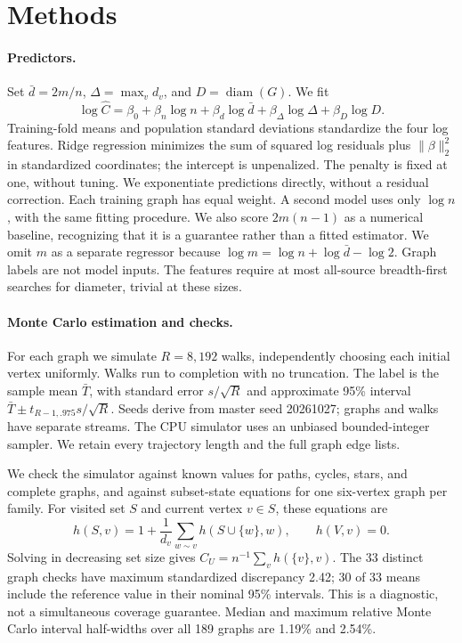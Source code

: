 \documentclass{article}
\begin{document}
\section{Methods}
\paragraph{Predictors.}
Set $\bar d=2m/n$, $\Delta=\max_v d_v$, and $D=\operatorname{diam}(G)$. We fit
\begin{equation}
 \log\widehat C=\beta_0+\beta_n\log n+\beta_d\log\bar d+
 \beta_\Delta\log\Delta+\beta_D\log D.
 \label{eq:model}
\end{equation}
Training-fold means and population standard deviations standardize the four log features. Ridge regression minimizes the sum of squared log residuals plus $\|\beta\|_2^2$ in standardized coordinates; the intercept is unpenalized. The penalty is fixed at one, without tuning. We exponentiate predictions directly, without a residual correction. Each training graph has equal weight. A second model uses only $\log n$, with the same fitting procedure. We also score $2m(n-1)$ as a numerical baseline, recognizing that it is a guarantee rather than a fitted estimator. We omit $m$ as a separate regressor because $\log m=\log n+\log\bar d-\log2$. Graph labels are not model inputs. The features require at most all-source breadth-first searches for diameter, trivial at these sizes.

\paragraph{Monte Carlo estimation and checks.}
For each graph we simulate $R=8{,}192$ walks, independently choosing each initial vertex uniformly. Walks run to completion with no truncation. The label is the sample mean $\bar T$, with standard error $s/\sqrt R$ and approximate 95\% interval $\bar T\pm t_{R-1,.975}s/\sqrt R$. Seeds derive from master seed 20261027; graphs and walks have separate streams. The CPU simulator uses an unbiased bounded-integer sampler. We retain every trajectory length and the full graph edge lists.

We check the simulator against known values for paths, cycles, stars, and complete graphs, and against subset-state equations for one six-vertex graph per family. For visited set $S$ and current vertex $v\in S$, these equations are
\begin{equation}
 h(S,v)=1+\frac{1}{d_v}\sum_{w\sim v}h(S\cup\{w\},w),\qquad h(V,v)=0.
\end{equation}
Solving in decreasing set size gives $C_U=n^{-1}\sum_v h(\{v\},v)$. The 33 distinct graph checks have maximum standardized discrepancy 2.42; 30 of 33 means include the reference value in their nominal 95\% intervals. This is a diagnostic, not a simultaneous coverage guarantee. Median and maximum relative Monte Carlo interval half-widths over all 189 graphs are 1.19\% and 2.54\%.
\end{document}
